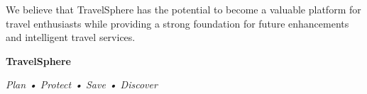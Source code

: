 \documentclass[12pt,a4paper]{article}
\begin{document}
We believe that TravelSphere has the potential to become a valuable platform for travel enthusiasts while providing a strong foundation for future enhancements and intelligent travel services.

\vspace{1cm}

\begin{center}

\Large \textbf{TravelSphere}

\vspace{0.3cm}

\textit{Plan • Protect • Save • Discover}

\end{center}

\end{document}
